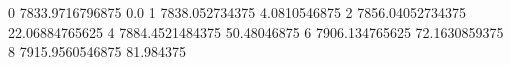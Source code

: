 0 7833.9716796875 0.0
1 7838.052734375 4.0810546875
2 7856.04052734375 22.06884765625
4 7884.4521484375 50.48046875
6 7906.134765625 72.1630859375
8 7915.9560546875 81.984375

